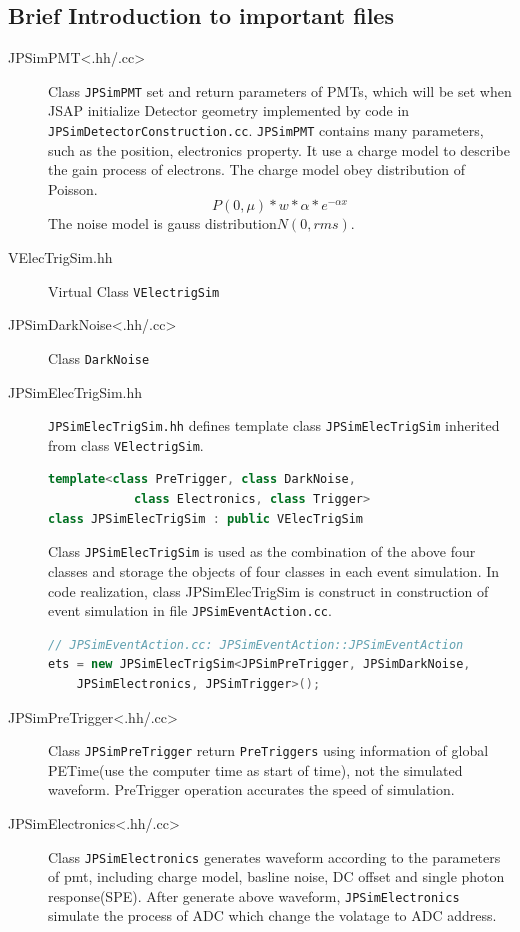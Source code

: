 \subsection{Brief Introduction to important files}
\begin{description}
    \item[JPSimPMT<.hh/.cc>] Class \texttt{JPSimPMT} set and return parameters of PMTs, 
    which will be set when JSAP initialize Detector geometry implemented by code in \texttt{JPSimDetectorConstruction.cc}.
    \texttt{JPSimPMT} contains many parameters, such as the position, electronics property. It use a charge model to describe
    the gain process of electrons. The charge model obey distribution of Poisson.
    \[P(0, \mu)*w*\alpha*e^{-\alpha x}\]
    The noise model is gauss distribution$N(0, rms)$.
    \item[VElecTrigSim.hh] Virtual Class \texttt{VElectrigSim}
    \item[JPSimDarkNoise<.hh/.cc>]  Class \texttt{DarkNoise}
    \item[JPSimElecTrigSim.hh]\label{JPSimElecTrigSim} \texttt{JPSimElecTrigSim.hh} defines template class \texttt{JPSimElecTrigSim} inherited from class \texttt{VElectrigSim}.
    \begin{lstlisting}[language=C++]
template<class PreTrigger, class DarkNoise,
            class Electronics, class Trigger>
class JPSimElecTrigSim : public VElecTrigSim
    \end{lstlisting}
    Class \texttt{JPSimElecTrigSim} is used as the combination of the above four classes and storage the objects of four classes in each event simulation. In code realization, class JPSimElecTrigSim
    is construct in construction of event simulation in file \texttt{JPSimEventAction.cc}. 
    \begin{lstlisting}[language=C++]
// JPSimEventAction.cc: JPSimEventAction::JPSimEventAction
ets = new JPSimElecTrigSim<JPSimPreTrigger, JPSimDarkNoise,
    JPSimElectronics, JPSimTrigger>();
    \end{lstlisting}
    \item[JPSimPreTrigger<.hh/.cc>] Class \texttt{JPSimPreTrigger} return \texttt{PreTriggers} using information of global PETime(use the computer time as start of time), not the simulated waveform.
    PreTrigger operation accurates the speed of simulation.
    \item[JPSimElectronics<.hh/.cc>] Class \texttt{JPSimElectronics} generates waveform according to the parameters of pmt, including charge model, basline noise, DC offset and single photon response(SPE).
    After generate above waveform, \texttt{JPSimElectronics} simulate the process of ADC which change the volatage to ADC address.
    

\end{description}
